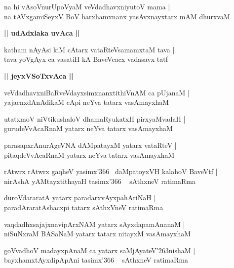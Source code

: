 \documentclass[twoside,12pt,openright]{book}
\def\S{\char'263}
\newcounter{shloka}[chapter]
\def\uvaca#1{\centerline{{\large\textbf{#1}}}}
\begin{document}
\begin{shloka}%
na hi vAsoVnurUpoVyaM veVdadhavxniyutoV mama |\\
na tAVxgamiSeyxV BoV barxhamxnanx yasAvxnayxtarx mAM dhurxvaM 
\end{shloka}

\uvaca{|| udAdxlaka uvAca ||}

\begin{shloka}%
katham nAyAsi kiM cAtarx vataRteVsamamxtaM tava |\\
tava yoVgAyx ca vasatiH kA BaveVcacx vadasavx tatf
\end{shloka}

\uvaca{|| jeyxVSoTxvAca ||}

\begin{shloka}%
veVdadhavxniBaRveVdayxsimxnanxtithiVnAM ca pUjanaM |\\
yajacnxdAnAdikaM cApi neYva tatarx vasAmayxhaM 
\end{shloka}

\begin{shloka}%
utatxmoV niVtikushaloV dhamaRyukatxH pirxyaMvadaH |\\
gurudeVvAcaRnaM yatarx neYva tatarx vasAmayxhaM 
\end{shloka}

\begin{shloka}%
parasapxrAnurAgeVNA dAMpatayxM yatarx vataRteV |\\
pitaqdeVvAcaRnaM yatarx neYva tatarx vasAmayxhaM 
\end{shloka}

\begin{shloka}%
rAtwrx rAtwrx gaqheV yasimx\char'366 ~daMpatoyxVH kalahoV BaveVtf |\\
nirAshA yAMtayxtithayaH tasimx\char'366 ~ sAthxneV ratimaRma 
\end{shloka}

\begin{shloka}%
duroVdararatA yatarx paradarxvAyxpahAriNaH |\\
paradAraratAshacxpi tatarx sAthxVneV ratimaRma
\end{shloka}

\begin{shloka}%
vaqdadhxsajajxnavipArxNAM yatarx sAyxdapamAnanaM |\\
niSuNxraM BASaNaM yatarx tatarx nitayxM vasAmayxhaM
\end{shloka}

\begin{shloka}%
goVvadhoV madayxpAnaM ca yatarx saMjAyateV\S nishaM |\\
bayxhamxtAyxdipApAni tasimx\char'366 ~ sAthxneV ratimaRma
\end{shloka}
\end{document}
